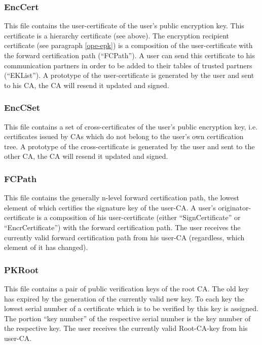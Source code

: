 \subsubsection{EncCert}
\label{enccert}

This file contains the user-certificate of the
user's public encryption key. This certificate is a
hierarchy certificate (see above).
The encryption recipient certificate (see paragraph \ref{ope-epk})
is a composition of the user-certificate with the
forward certification path (``FCPath'').
A user can send this certificate to his communication
partners in order to be added to their tables of trusted
partners (``EKList'').
A prototype of the
user-certificate is generated by the user
and sent to his CA, the CA will resend it updated and signed.

\subsubsection{EncCSet}
\label{enccset}

This file contains a set of cross-certificates of the
user's public encryption key, i.e. certificates issued
by CAs which do not belong to the user's own certification tree.
A prototype of the
cross-certificate is generated by the user
and sent to the other CA, the CA will resend it updated and signed.

\subsubsection{FCPath}
\label{fcpath}

This file contains the generally n-level forward certification path,
the lowest element of which certifies the signature key of the user-CA.
A user's originator-certificate is a composition of his
user-certificate (either ``SignCertificate'' or ``EncrCertificate'')
with the forward certification path.
The user receives the currently valid forward certification path
from his user-CA (regardless, which element of it has changed).

\subsubsection{PKRoot}
\label{pkroot}

This file contains a pair of public verification keys of the root CA.
The old key has expired by the generation of the currently valid new key.
To each key
the lowest serial number of a certificate which is to be verified by
this key is assigned.
The portion ``key number'' of the respective serial number is
the key number of the respective key.
The user receives the currently valid Root-CA-key from his user-CA.

